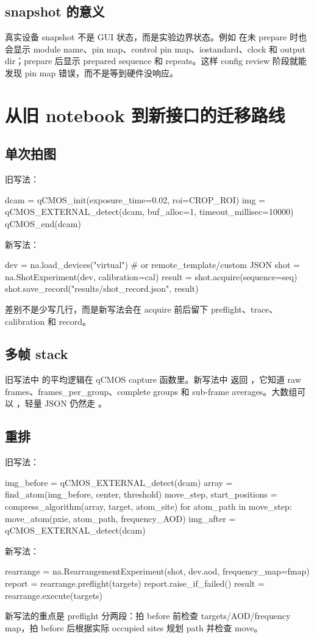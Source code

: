 \documentclass[11pt,oneside,openany]{book}
\begin{document}
\section{snapshot 的意义}
真实设备 snapshot 不是 GUI 状态，而是实验边界状态。例如  在未 prepare 时也会显示 module name、pin map、control pin map、iostandard、clock 和 output dir；prepare 后显示 prepared sequence 和 repeats。这样 config review 阶段就能发现 pin map 错误，而不是等到硬件没响应。

\chapter{从旧 notebook 到新接口的迁移路线}
\section{单次拍图}
旧写法：
\begin{codeblock}[Python]
dcam = qCMOS_init(exposure_time=0.02, roi=CROP_ROI)
img = qCMOS_EXTERNAL_detect(dcam, buf_alloc=1, timeout_millisec=10000)
qCMOS_end(dcam)
\end{codeblock}
新写法：
\begin{codeblock}[Python]
dev = na.load_devices("virtual")  # or remote_template/custom JSON
shot = na.ShotExperiment(dev, calibration=cal)
result = shot.acquire(sequence=seq)
shot.save_record("results/shot_record.json", result)
\end{codeblock}
差别不是少写几行，而是新写法会在 acquire 前后留下 preflight、trace、calibration 和 record。

\section{多帧 stack}
旧写法中  的平均逻辑在 qCMOS capture 函数里。新写法中  返回 ，它知道 raw frames、frames\_per\_group、complete groups 和 sub-frame averages。大数组可以 ，轻量 JSON 仍然走 。

\section{重排}
旧写法：
\begin{codeblock}[Python]
img_before = qCMOS_EXTERNAL_detect(dcam)
array = find_atom(img_before, center, threshold)
move_step, start_positions = compress_algorithm(array, target, atom_site)
for atom_path in move_step:
    move_atom(pxie, atom_path, frequency_AOD)
img_after = qCMOS_EXTERNAL_detect(dcam)
\end{codeblock}
新写法：
\begin{codeblock}[Python]
rearrange = na.RearrangementExperiment(shot, dev.aod, frequency_map=fmap)
report = rearrange.preflight(targets)
report.raise_if_failed()
result = rearrange.execute(targets)
\end{codeblock}
新写法的重点是 preflight 分两段：拍 before 前检查 targets/AOD/frequency map，拍 before 后根据实际 occupied sites 规划 path 并检查 move。
\end{document}
